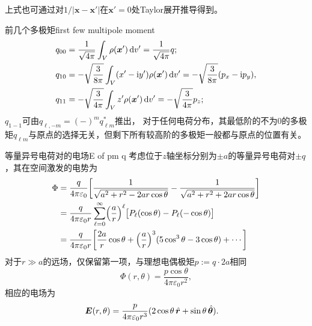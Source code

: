 上式也可通过对$1/|\bm x-\bm x'|$在$\bm x'=0$处Taylor展开推导得到。
\begin{example}{前几个多极矩}{first few multipole moment}
    \begin{equation*}
        \begin{aligned}
            q_{00}&=\frac1{\sqrt{4\pi}}\int_V\rho(\bm x')\mathop{}\!\mathrm{d} v'=\frac1{\sqrt{4\pi}}q;\\
            q_{10}&=-\sqrt{\frac3{8\pi}}\int_V(x'-\mathrm{i} y')\rho(\bm x')\mathop{}\!\mathrm{d} v'=-\sqrt{\frac3{8\pi}}(p_x-\mathrm{i} p_y),\\
            q_{11}&=-\sqrt{\frac3{4\pi}}\int_V z'\rho(\bm x')\mathop{}\!\mathrm{d} v'=-\sqrt{\frac3{4\pi}}p_z;
        \end{aligned}
    \end{equation*}
    $q_{1-1}$可由$q_{\ell,-m}=(-)^mq_{\ell m}^\ast$推出，
    \tcblower
    对于任何电荷分布，其最低阶的不为0的多极矩$q_{\ell m}$与原点的选择无关，但剩下所有较高阶的多极矩一般都与原点的位置有关。
\end{example}

\begin{example}{等量异号电荷对的电场}{E of pm q}
    考虑位于$z$轴坐标分别为$\pm a$的等量异号电荷对$\pm q$，其在空间激发的电势为
    \begin{align*}
        \Phi&=\frac q{4\pi\varepsilon_0}\biggl[\frac1{\sqrt{a^2+r^2-2ar\cos\theta}}-\frac1{\sqrt{a^2+r^2+2ar\cos\theta}}\biggr]\\
        &=\frac q{4\pi\varepsilon_0r}\sum_{\ell=0}^{\infty}\Bigl(\frac ar\Bigr)^\ell\bigl[P_{\ell}(\cos\theta)-P_\ell(-\cos\theta)\bigr]\\
        &=\frac q{4\pi\varepsilon_0r}\biggl[\frac{2a}r\cos\theta+\Bigl(\frac ar\Bigr)^3(5\cos^3\theta-3\cos\theta)+\cdots\biggr]
    \end{align*}
    对于$r\gg a$的远场，仅保留第一项，与理想电偶极矩$p:=q\cdot 2a$相同
    \begin{equation}
        \label{eqn:edipole-Phi}
        \Phi(r,\theta)=\frac{p\cos\theta}{4\pi\varepsilon_0r^2},
    \end{equation}
    相应的电场为
    \begin{align}
        \label{eqn:edipole-E}
        \bm E(r,\theta)&=\frac{p}{4\pi\varepsilon_0r^3}(2\cos\theta\mathop{}\!\hat{\bm r}+\sin\theta\mathop{}\!\hat{\bm \theta}).
    \end{align}
\end{example}
